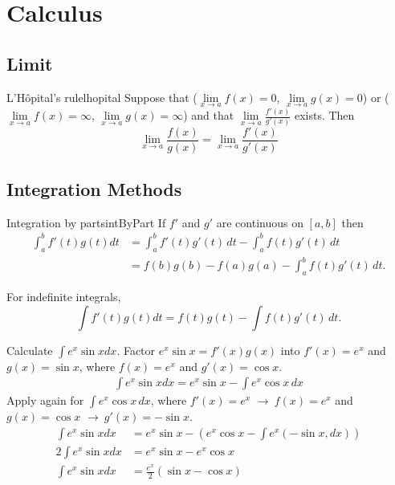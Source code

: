 \documentclass[11pt,a4paper,fleqn]{article}
\numberwithin{equation}{section}
\newcommand{\g}{$\rightarrow\ $}
\begin{document}
\clearpage

\section{Calculus}
\subsection{Limit}
\begin{fact}{L'Hôpital's rule}{lhopital}
    Suppose that ($\lim\limits_{x\rightarrow a}f(x)=0$, $\lim\limits_{x\rightarrow a}g(x)=0$) or ($\lim\limits_{x\rightarrow a}f(x)=\infty$, $\lim\limits_{x\rightarrow a}g(x)=\infty$) and that $\lim\limits_{x\rightarrow a}\frac{f'(x)}{g'(x)}$ exists.
    Then
    \[
    \lim\limits_{x\rightarrow a}\frac{f(x)}{g(x)} = \lim\limits_{x\rightarrow a}\frac{f'(x)}{g'(x)}
    \]
\end{fact}

\subsection{Integration Methods}
\begin{fact}{Integration by parts}{intByPart}
    If $f'$ and $g'$ are continuous on $[a,b]$ then
    \begin{align*}
        \int_{a}^{b} f'(t)g(t) dt & = \int_{a}^{b} f'(t)g'(t)\,dt - \int_{a}^{b} f(t)g'(t)\,dt\\
        & = f(b)g(b)-f(a)g(a) - \int_{a}^{b} f(t)g'(t)\,dt.
    \end{align*}

    For indefinite integrals,
    \[
    \int f'(t)g(t) dt = f(t)g(t) - \int f(t)g'(t)\,dt.
    \]
\end{fact}

\begin{exec}
    Calculate $\int e^x \sin{x} dx$.
    \tcblower
    Factor $e^x\sin{x} = f'(x)g(x)$ into $f'(x) =e^x$ and $g(x)=\sin{x}$,
    where $f(x)=e^x$ and $g'(x)=\cos{x}$.
    \begin{align*}
        \int e^x \sin{x} dx = e^x \sin{x} - \int e^x \cos{x}\,dx
    \end{align*}
    Apply  again for $\int e^x \cos{x}\,dx$,
    where $f'(x)=e^x$ \g $f(x)=e^x$ and $g(x)=\cos{x}$ \g $g'(x)=-\sin{x}$.
    \begin{align*}
        \int e^x \sin{x} dx &= e^x \sin{x} - (e^x\cos{x}-\int e^x (-\sin{x},dx))\\
        2\int e^x \sin{x} dx &= e^x \sin{x} - e^x\cos{x} \\
        \int e^x \sin{x} dx &= \frac{e^x}{2} \left(\sin{x} - \cos{x}\right)
    \end{align*}
\end{exec}
\end{document}
